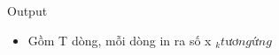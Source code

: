 Output
\begin{itemize}
	\item     Gồm T dòng, mỗi dòng in ra số x    $_     k tương ứng     


$
\end{itemize}